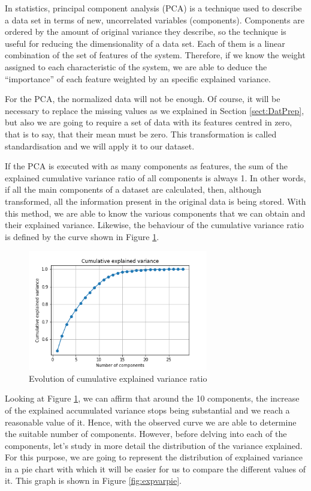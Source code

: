 In statistics, principal component analysis (PCA) is a technique used to describe a data set in terms of new, uncorrelated variables (components). Components are ordered by the amount of original variance they describe, so the technique is useful for reducing the dimensionality of a data set. Each of them is a linear combination of the set of features of the system. Therefore, if we know the weight assigned to each characteristic of the system, we are able to deduce the ``importance'' of each feature weighted by an specific explained variance.

For the PCA, the normalized data will not be enough. Of course, it will be necessary to replace the missing values as we explained in Section \ref{sect:DatPrep}, but also we are going to require a set of data with its features centred in zero, that is to say, that their mean must be zero. This transformation is called standardisation and we will apply it to our dataset.

If the PCA is executed with as many components as features, the sum of the explained cumulative variance ratio of all components is always 1. In other words, if all the main components of a dataset are calculated, then, although transformed, all the information present in the original data is being stored. With this method, we are able to know the various components that we can obtain and their explained variance. Likewise, the behaviour of the cumulative variance ratio is defined by the curve shown in Figure \ref{fig:cumexpvar}.

\begin{figure}[h]
	\centering%
	\centerline{\includegraphics[width=0.7\textwidth]{Imagenes/Bitmap/PCA/cumexpvar.png}}%
	\caption{Evolution of cumulative explained variance ratio}%
	\label{fig:cumexpvar}
\end{figure}

Looking at Figure \ref{fig:cumexpvar}, we can affirm that around the 10 components, the increase of the explained accumulated variance stops being substantial and we reach a reasonable value of it. Hence, with the observed curve we are able to determine the suitable number of components. However, before delving into each of the components, let's study in more detail the distribution of the variance explained. For this purpose, we are going to represent the distribution of explained variance in a pie chart with which it will be easier for us to compare the different values of it. This graph is shown in Figure \ref{fig:expvarpie}.

